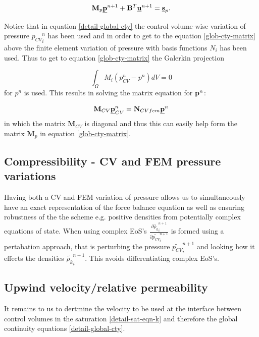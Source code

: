 \begin{equation}
{\mathbf M}_p \underline{\bf p}^{n+1} + {\mathbf B}^T \underline{\bf u}^{n+1} 
= \underline{\bf s}_p. 
\label{glob-cty-matrix}
\end{equation}

Notice that in equation \ref{detail-global-cty} the 
control volume-wise variation of pressure ${p_{CV}}_i^n$ has been 
used and in order to get to the equation  \ref{glob-cty-matrix} 
above the finite element variation of pressure with basis 
functions $N_i$ has been used. Thus to get to equation 
\ref{glob-cty-matrix} the Galerkin projection

\begin{equation}
\int_{\Omega} M_i (p_{CV}^n-p^n) dV =0
\end{equation}
for $p^n$ is used. This results in solving the matrix 
equation for ${\bf p}^n$: 

\begin{equation}
{\mathbf M}_{CV} \underline{\bf p}_{CV}^n = {\mathbf N}_{CVfem} \underline {\bf p}^n
\end{equation}
in which the matrix ${\mathbf M}_{CV}$ is diagonal and thus 
this can easily help form the matrix ${\mathbf M}_p$ in equation 
\ref{glob-cty-matrix}. 

\subsection{Compressibility - CV and FEM pressure variations}

Having both a CV and FEM variation of pressure allows us to 
simultaneously have an exact representation of the force balance 
equation as well as ensuring robustness of the the scheme 
e.g. positive densities from potentially complex equations 
of state. When using complex EoS's $\frac{\partial \tilde { \rho_k}_i^{n+1}}{\partial \tilde {p_{CV}}_i^{n+1}}$ is formed 
using a pertabation approach, that is 
perturbing the pressure $\tilde {p_{CV}}_i^{n+1}$ and looking how 
it effects the densities $\tilde {\rho_k}_i^{n+1}$. This 
avoids differentiating complex EoS's. 

				

\subsection{Upwind velocity/relative permeability} 
\label{opt-up} 

It remains to us to dertmine the velocity to be used 
at the interface between control volumes in the 
saturation \ref{detail-sat-eqn-k} and therefore 
the global continuity equations \ref{detail-global-cty}. 


